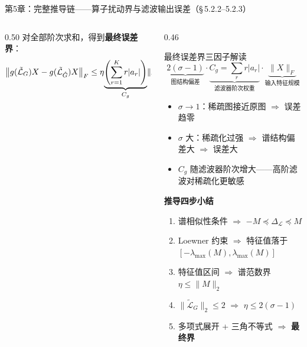 \documentclass[aspectratio=169,9pt,xcolor=dvipsnames]{beamer}
\newcommand{\highlight}[1]{\textcolor{myred}{\textbf{#1}}}
\begin{document}
\begin{frame}{第5章：完整推导链——算子扰动界与滤波输出误差（§\,5.2.2--5.2.3）}
\begin{columns}[T]
\begin{column}{0.50\textwidth}
{  对全部阶次求和，得到\textbf{最终误差界}：
  \begin{equation*}
    \bigl\|g(\tilde{\mathcal{L}}_G)X-g(\tilde{\mathcal{L}}_{\hat{G}})X\bigr\|_F
    \le\eta\!\underbrace{\left(\sum_{r=1}^{K}r|a_r|\right)}_{C_g}\!\|X\|_F
    \le{\color{myred}2(\sigma-1)\,C_g\,\|X\|_F}
  \end{equation*}
  }
\end{column}

\begin{column}{0.46\textwidth}
  \begin{block}{最终误差界三因子解读}
    \begin{equation*}
      \underbrace{2(\sigma-1)}_{\text{图结构偏差}}
      \cdot
      \underbrace{C_g=\sum_{r}r|a_r|}_{\text{滤波器阶次权重}}
      \cdot
      \underbrace{\|X\|_F}_{\text{输入特征规模}}
    \end{equation*}
    \small
    \begin{itemize}\setlength{\itemsep}{3pt}
      \item $\sigma\to 1$：稀疏图接近原图 $\Rightarrow$ 误差趋零
      \item $\sigma$ 大：稀疏化过强 $\Rightarrow$ 谱结构偏差大 $\Rightarrow$ 误差大
      \item $C_g$ 随滤波器阶次增大——高阶滤波对稀疏化更敏感
    \end{itemize}
  \end{block}

  \vspace{0.2cm}
  \textbf{推导四步小结}
  \begin{enumerate}\small\setlength{\itemsep}{4pt}
    \item 谱相似性条件 $\Rightarrow$ $-M\preceq\Delta_{\mathcal{L}}\preceq M$
    \item Loewner 约束 $\Rightarrow$ 特征值落于 $[-\lambda_{\max}(M),\lambda_{\max}(M)]$
    \item 特征值区间 $\Rightarrow$ 谱范数界 $\eta\le\|M\|_2$
    \item $\|\tilde{\mathcal{L}}_G\|_2\le 2$ $\Rightarrow$ \highlight{$\eta\le 2(\sigma-1)$}
    \item 多项式展开 + 三角不等式 $\Rightarrow$ \highlight{最终界}
  \end{enumerate}

\end{column}
\end{columns}
\end{frame}
\end{document}
